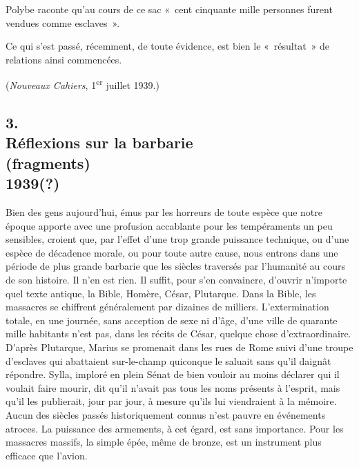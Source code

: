 \documentclass[french,twoside]{book} %
\begin{document}
Polybe raconte qu'au cours de ce sac « cent cinquante mille personnes furent vendues comme esclaves ».\par
Ce qui s'est passé, récemment, de toute évidence, est bien le « résultat » de relations ainsi commencées.\par
({\itshape Nouveaux Cahiers}, 1\textsuperscript{er} juillet 1939.)\par

\begin{center}
\end{center}
\subsection[3. Réflexions sur la barbarie, (fragments) 1939(?)]{3. \\
Réflexions sur la barbarie \\
(fragments) \\
1939(?)}
\noindent \par
Bien des gens aujourd'hui, émus par les horreurs de toute espèce que notre époque apporte avec une profusion accablante pour les tempéraments un peu sensibles, croient que, par l'effet d'une trop grande puissance technique, ou d'une espèce de décadence morale, ou pour toute autre cause, nous entrons dans une période de plus grande barbarie que les siècles traversés par l'huma­nité au cours de son histoire. Il n'en est rien. Il suffit, pour s'en convaincre, d'ouvrir n'importe quel texte antique, la Bible, Homère, César, Plutarque. Dans la Bible, les massacres se chiffrent généralement par dizaines de milliers. L'extermination totale, en une journée, sans acception de sexe ni d'âge, d'une ville de quarante mille habitants n'est pas, dans les récits de César, quelque chose d'extraordinaire. D'après Plutarque, Marius se promenait dans les rues de Rome suivi d'une troupe d'esclaves qui abattaient sur-le-champ quiconque le saluait sans qu'il daignât répondre. Sylla, imploré en plein Sénat de bien vouloir au moins déclarer qui il voulait faire mourir, dit qu'il n'avait pas tous les noms présents à l'esprit, mais qu'il les publierait, jour par jour, à mesure qu'ils lui viendraient à la mémoire. Aucun des siècles passés historiquement connus n'est pauvre en événements atroces. La puissance des armements, à cet égard, est sans importance. Pour les massacres massifs, la simple épée, même de bronze, est un instrument plus efficace que l'avion.\par
\end{document}
